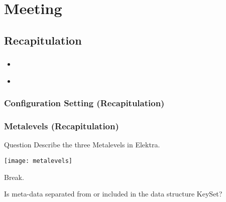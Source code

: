 \section{Meeting}
\subsection{Recapitulation}
{
\shadowoffset{0.5pt}
%
\begin{frame}
	\frametitle{}

	\pause

	\begin{itemize}
		\item   \textcolor{white}{}\\
			\textcolor{white}{}
		\item   \textcolor{white}{}
	\end{itemize}
\end{frame}
}

\begin{frame}
	\frametitle{Configuration Setting (Recapitulation)}

	\pause

	
\end{frame}

\begin{frame}
	\frametitle{Metalevels (Recapitulation)}
	\begin{alertblock}{Question}
	Describe the three Metalevels in Elektra.
	\end{alertblock}

	\pause
	\texttt{[image: metalevels]}
\end{frame}

\begin{assignment}
	\begin{task}
	Break.
	\end{task}
\end{assignment}


\begin{assignment}
	\begin{task}
	Is meta-data separated from or included in the data structure KeySet?
	\end{task}
\end{assignment}


